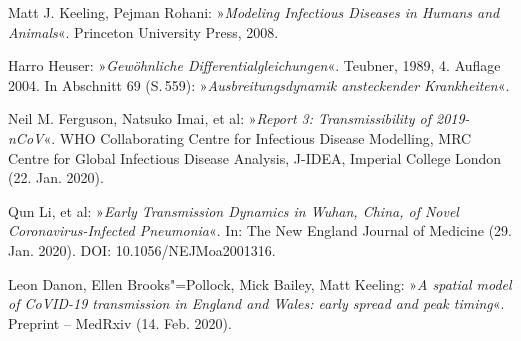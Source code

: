 \documentclass[a4paper,11pt,fleqn,twocolumn,twoside,dvipdfmx]{scrartcl}
\numberwithin{equation}{section}
\begin{document}
\clearpage
\twocolumn
\small

\begin{thebibliography}{00}
 Matt J. Keeling, Pejman Rohani:
»\emph{Modeling Infectious Diseases in Humans and Animals}«.
Princeton University Press, 2008.

 Harro Heuser: »\emph{Gewöhnliche Differentialgleichungen}«.
Teubner, 1989, 4. Auflage 2004. In Abschnitt 69 (S.\,559):
»\emph{Ausbreitungsdynamik ansteckender Krankheiten}«.

 Neil M. Ferguson, Natsuko Imai, et al:
»\emph{Report 3: Transmissibility of 2019-nCoV}«.
WHO Collaborating Centre for Infectious Disease Modelling, MRC Centre
for Global Infectious Disease Analysis, J-IDEA, Imperial College London
(22. Jan. 2020).

 Qun Li, et al: »\emph{Early Transmission Dynamics in
Wuhan, China, of Novel Coronavirus-Infected Pneumonia}«.
In: The New England Journal of Medicine (29. Jan. 2020).
DOI: 10.1056/NEJMoa2001316.

 Leon Danon, Ellen Brooks"=Pollock, Mick Bailey,
Matt Keeling:
»\emph{A spatial model of CoVID-19 transmission in England and Wales:
early spread and peak timing}«. Preprint -- MedRxiv (14. Feb. 2020).


\end{thebibliography}
\end{document}
